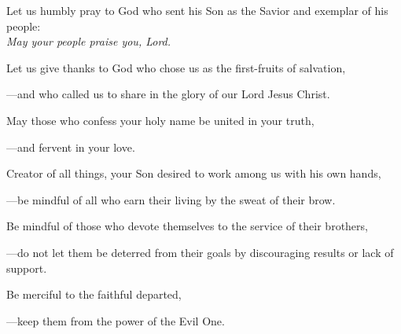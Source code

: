 \intercessions\indent

\begin{hangpar}

Let us humbly pray to God who sent his Son as the Savior and exemplar of his people:\\
\emph{May your people praise you, Lord.}

\medskip Let us give thanks to God who chose us as the first-fruits of salvation,

{\color{red}---\thinspace}and who called us to share in the glory of our Lord Jesus Christ.

\medskip May those who confess your holy name be united in your truth,

{\color{red}---\thinspace}and fervent in your love.

\medskip Creator of all things, your Son desired to work among us with his own hands,

{\color{red}---\thinspace}be mindful of all who earn their living by the sweat of their brow.

\medskip Be mindful of those who devote themselves to the service of their brothers,

{\color{red}---\thinspace}do not let them be deterred from their goals by discouraging results or lack of support.

\medskip Be merciful to the faithful departed,

{\color{red}---\thinspace}keep them from the power of the Evil One.

\end{hangpar}

